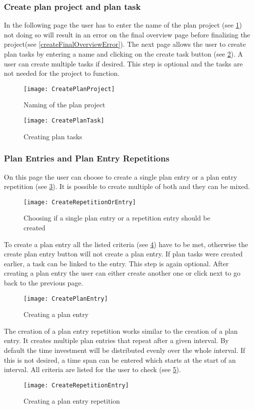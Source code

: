 \subsubsection{Create plan project and plan task}
In the following page the user has to enter the name of the plan project (see \ref{createPlanProject}) not doing so will result in an error on the final overview page before finalizing the project(see \ref{createFinalOverviewError}). The next page allows the user to create plan tasks by entering a name and clicking on the create task button (see \ref{createPlanTask}). A user can create multiple tasks if desired. This step is optional and the tasks are not needed for the project to function.

\begin{figure}[H]
	\centering
	\texttt{[image: CreatePlanProject]}
	\caption{Naming of the plan project}
	\label{createPlanProject}
\end{figure}
\begin{figure}[H]
	\centering
	\texttt{[image: CreatePlanTask]}
	\caption{Creating plan tasks}
	\label{createPlanTask}
\end{figure}

\subsubsection{Plan Entries and Plan Entry Repetitions}
On this page the user can choose to create a single plan entry or a plan entry repetition (see \ref{createRepetitionOrEntry}). It is possible to create multiple of both and they can be mixed.
\begin{figure}[H]
	\centering
	\texttt{[image: CreateRepetitionOrEntry]}
	\caption{Choosing if a single plan entry or a repetition entry should be created}
	\label{createRepetitionOrEntry}
\end{figure}
To create a plan entry all the listed criteria (see \ref{createPlanEntry}) have to be met, otherwise the create plan entry button will not create a plan entry. If plan tasks were created earlier, a task can be linked to the entry. This step is again optional. After creating a plan entry the user can either create another one or click next to go back to the previous page.
\begin{figure}[H]
	\centering
	\texttt{[image: CreatePlanEntry]}
	\caption{Creating a plan entry}
	\label{createPlanEntry}
\end{figure}
The creation of a plan entry repetition works similar to the creation of a plan entry. It creates multiple plan entries that repeat after a given interval. By default the time investment will be distributed evenly over the whole interval. If this is not desired, a time span can be entered which starts at the start of an interval. All criteria are listed for the user to check (see \ref{createRepetitionEntry}).
\begin{figure}[H]
	\centering
	\texttt{[image: CreateRepetitionEntry]}
	\caption{Creating a plan entry repetition}
	\label{createRepetitionEntry}
\end{figure}

